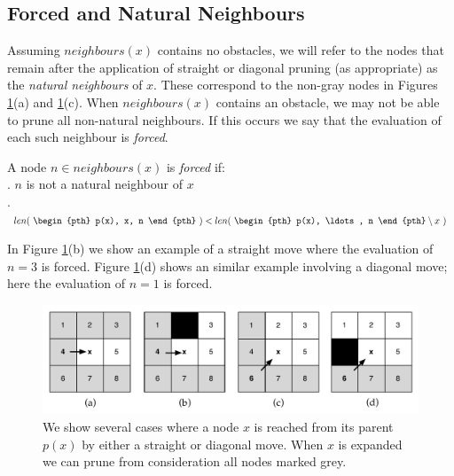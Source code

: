 \par \noindent
\subsection{Forced and Natural Neighbours}
Assuming $neighbours(x)$ contains no obstacles, we will refer to the nodes
that remain after the application of straight or diagonal pruning (as
appropriate) as the \emph{natural neighbours} of $x$. These correspond to the non-gray
nodes in Figures \ref{fig::jps::pruning}(a) and \ref{fig::jps::pruning}(c).
When $neighbours(x)$ contains an obstacle, we may not be able to prune
all non-natural neighbours. If this occurs we say that the evaluation of each
such neighbour is \emph{forced}.

\begin{definition}
\label{def::jps::forced}
A node $n \in neighbours(x)$ is \emph{forced} if: \\
. $n$ is not a natural neighbour of $x$\\
. $ len(~\begin{pth} p(x), x, n \end{pth}~) < len(~ \begin{pth} p(x), \ldots, n \end{pth} \setminus x~)$
\end{definition}
\par \noindent
In Figure \ref{fig::jps::pruning}(b) we show an example of a straight move where 
the evaluation of $n = 3$ is forced. Figure \ref{fig::jps::pruning}(d)  
shows an similar example involving a diagonal move; here the evaluation of
$n = 1$ is forced.

\begin{figure}[tb]
       \begin{center}
		   \includegraphics[width=0.95\columnwidth, trim = 10mm 10mm 10mm 0mm]
			{chapter_jps/diagrams/pruningrules.pdf}
       \end{center}
	\vspace{-3pt}
       \caption[JPS pruning rules]
{\small
We show several cases where a node $x$ is reached from its
parent $p(x)$ by either a straight or diagonal move. When $x$ is expanded we can
prune from consideration all nodes marked grey.}
       \label{fig::jps::pruning}
\end{figure}


